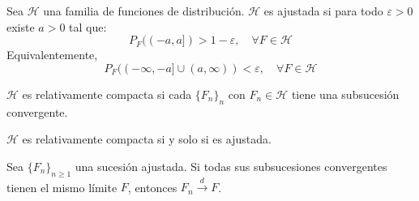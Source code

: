 \begin{definition}
    Sea $\mathcal{H}$ una familia de funciones de distribución.
    $\mathcal{H}$ es ajustada si para todo $\varepsilon>0$ existe $a>0$ tal que:
    $$P_F((-a,a]) > 1-\varepsilon, \quad \forall F \in \mathcal{H}$$
    Equivalentemente,
    $$P_F((-\infty,-a] \cup (a,\infty)) < \varepsilon, \quad \forall F \in \mathcal{H}$$
\end{definition}

\begin{definition}
    $\mathcal{H}$ es relativamente compacta si cada $\{F_n\}_n$ con $F_n \in \mathcal{H}$ tiene una subsucesión convergente.
\end{definition}

\begin{theorem}[Prokhorov]
    $\mathcal{H}$ es relativamente compacta si y solo si es ajustada.
\end{theorem}

\begin{theorem}
    Sea $\{F_n\}_{n \geq 1}$ una sucesión ajustada.
    Si todas sus subsucesiones convergentes tienen el mismo límite $F$, entonces $F_n \xrightarrow{d} F$.
\end{theorem}
